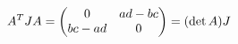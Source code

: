 \documentclass[preview]{standalone}
\begin{document}
\begin{align*}
\special{dvisvgm:raw <g id='unique000'>}A^TJA=\begin{pmatrix}0&ad-bc\\bc-ad&0\end{pmatrix}=(\det A)J\special{dvisvgm:raw </g>}
\end{align*}
\end{document}
